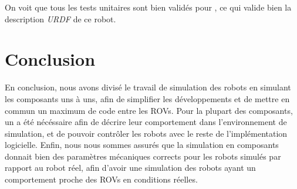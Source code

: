 			On voit que tous les tests unitaires sont bien validés pour \atoll{}, ce qui valide bien la description \textit{URDF} de ce robot.

	\section{Conclusion}
	
		En conclusion, nous avons divisé le travail de simulation des robots en simulant les composants uns à uns, afin de simplifier les développements et de mettre en commun un maximum de code entre les \gls{ROV}s. Pour la plupart des composants, un \plugin{} \gazebo{} a été nécéssaire afin de décrire leur comportement dans l'environnement de simulation, et de pouvoir contrôler les robots avec le reste de l'implémentation logicielle. Enfin, nous nous sommes assurés que la simulation en composants donnait bien des paramètres mécaniques corrects pour les robots simulés par rapport au robot réel, afin d'avoir une simulation des robots ayant un comportement proche des \gls{ROV}s en conditions réelles.
